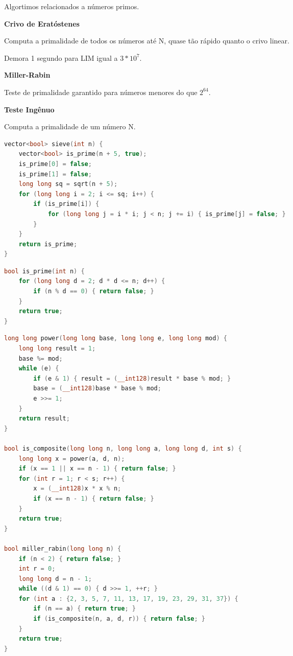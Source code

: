 \documentclass[11pt, a4paper, twoside]{book}
\begin{document}
Algortimos relacionados a números primos.



\textbf{Crivo de Eratóstenes} 

Computa a primalidade de todos os números até N, quase tão rápido quanto o crivo linear.





Demora 1 segundo para LIM igual a $3 * 10^7$.



\textbf{Miller-Rabin} 

Teste de primalidade garantido para números menores do que $2^64$.





\textbf{Teste Ingênuo} 

Computa a primalidade de um número N.




\hfill

\begin{lstlisting}[language=C++]
vector<bool> sieve(int n) {
    vector<bool> is_prime(n + 5, true);
    is_prime[0] = false;
    is_prime[1] = false;
    long long sq = sqrt(n + 5);
    for (long long i = 2; i <= sq; i++) {
        if (is_prime[i]) {
            for (long long j = i * i; j < n; j += i) { is_prime[j] = false; }
        }
    }
    return is_prime;
}
\end{lstlisting}

\hfill

\begin{multicols}{2}
\begin{lstlisting}[language=C++]
bool is_prime(int n) {
    for (long long d = 2; d * d <= n; d++) {
        if (n % d == 0) { return false; }
    }
    return true;
}
\end{lstlisting}
\end{multicols}

\hfill

\begin{lstlisting}[language=C++]
long long power(long long base, long long e, long long mod) {
    long long result = 1;
    base %= mod;
    while (e) {
        if (e & 1) { result = (__int128)result * base % mod; }
        base = (__int128)base * base % mod;
        e >>= 1;
    }
    return result;
}

bool is_composite(long long n, long long a, long long d, int s) {
    long long x = power(a, d, n);
    if (x == 1 || x == n - 1) { return false; }
    for (int r = 1; r < s; r++) {
        x = (__int128)x * x % n;
        if (x == n - 1) { return false; }
    }
    return true;
}

bool miller_rabin(long long n) {
    if (n < 2) { return false; }
    int r = 0;
    long long d = n - 1;
    while ((d & 1) == 0) { d >>= 1, ++r; }
    for (int a : {2, 3, 5, 7, 11, 13, 17, 19, 23, 29, 31, 37}) {
        if (n == a) { return true; }
        if (is_composite(n, a, d, r)) { return false; }
    }
    return true;
}
\end{lstlisting}
\end{document}
